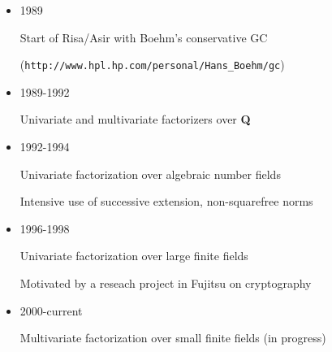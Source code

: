%
%
%
%
%
%
%
%
%
%

\begin{slide}{}

\begin{itemize}
\item 1989

Start of Risa/Asir with Boehm's conservative GC 

({\tt http://www.hpl.hp.com/personal/Hans\_Boehm/gc})

\item 1989-1992

Univariate and multivariate factorizers over {\bf Q}

\item 1992-1994

Univariate factorization over algebraic number fields

Intensive use of successive extension, non-squarefree norms

\item 1996-1998

Univariate factorization over large finite fields

Motivated by a reseach project in Fujitsu on cryptography

\item 2000-current 

Multivariate factorization over small finite fields (in progress)
\end{itemize}
\end{slide}

